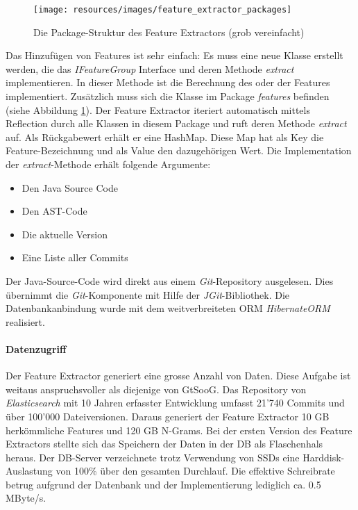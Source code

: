 \documentclass[10pt, a4paper]{article}
\begin{document}
\begin{figure}[h]
	\centering
	\texttt{[image: resources/images/feature\_extractor\_packages]}
	\caption[Packages vom Feature Extractor]{Die Package-Struktur des Feature Extractors (grob vereinfacht)}
	\label{fig:feature_extractor_packages}
\end{figure}

Das Hinzufügen von Features ist sehr einfach: Es muss eine neue Klasse erstellt werden, die das \emph{IFeatureGroup} Interface und deren Methode \emph{extract} implementieren. In dieser Methode ist die Berechnung des oder der Features implementiert. Zusätzlich muss sich die Klasse im Package \emph{features} befinden (siehe Abbildung \ref{fig:feature_extractor_packages}). Der Feature Extractor iteriert automatisch mittels Reflection durch alle Klassen in diesem Package und ruft deren Methode \emph{extract} auf. Als Rückgabewert erhält er eine HashMap. Diese Map hat als Key die Feature-Bezeichnung und als Value den dazugehörigen Wert. Die Implementation der \emph{extract}-Methode erhält folgende Argumente:
\begin{itemize}
	\item Den Java Source Code
	\item Den AST-Code
	\item Die aktuelle Version
	\item Eine Liste aller Commits
\end{itemize}
Der Java-Source-Code wird direkt aus einem \emph{Git}-Repository ausgelesen. Dies übernimmt die \emph{Git}-Komponente mit Hilfe der \emph{JGit}-Bibliothek. Die Datenbankanbindung wurde mit dem weitverbreiteten \ac{ORM} \emph{HibernateORM} realisiert.

\paragraph{Datenzugriff}

Der Feature Extractor generiert eine grosse Anzahl von Daten. Diese Aufgabe ist weitaus anspruchsvoller als diejenige von GtSooG. Das Repository von \emph{Elasticsearch} mit 10 Jahren erfasster Entwicklung umfasst 21'740 Commits und über 100'000 Dateiversionen. Daraus generiert der Feature Extractor 10 GB herkömmliche Features und 120 GB N-Grams. Bei der ersten Version des Feature Extractors stellte sich das Speichern der Daten in der \ac{DB} als Flaschenhals heraus. Der \ac{DB}-Server verzeichnete trotz Verwendung von SSDs eine Harddisk-Auslastung von 100\% über den gesamten Durchlauf. Die effektive Schreibrate betrug aufgrund der Datenbank und der Implementierung lediglich ca. 0.5 MByte/s.
\end{document}
